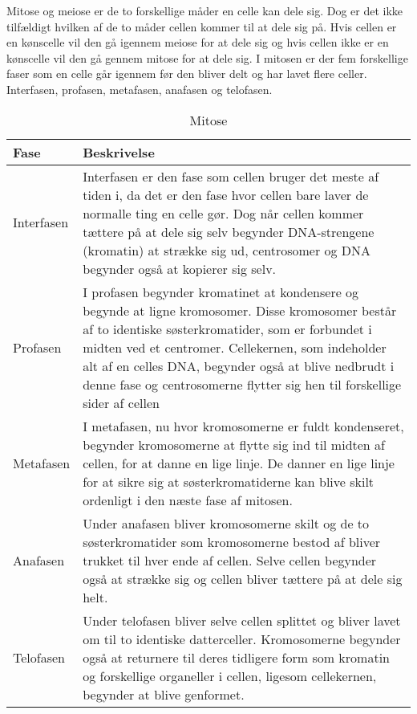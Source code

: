 Mitose og meiose er de to forskellige måder en celle kan dele sig. Dog er det ikke tilfældigt hvilken af de to måder cellen kommer til at dele sig på. Hvis cellen er en kønscelle vil den gå igennem meiose for at dele sig og hvis cellen ikke er en kønscelle vil den gå gennem mitose for at dele sig.
I mitosen er der fem forskellige faser som en celle går igennem før den bliver delt og har lavet flere celler. Interfasen, profasen, metafasen, anafasen og telofasen.
\begin{longtable}{ | m{2cm} | m{15cm}|}
    \caption{Mitose} \\
    \hline
    Fase & Beskrivelse \\ \hline
    Interfasen & Interfasen er den fase som cellen bruger det meste af tiden i, da det er den fase hvor cellen bare laver de normalle ting en celle gør. Dog når cellen kommer tættere på at dele sig selv begynder DNA-strengene (kromatin) at strække sig ud, centrosomer og DNA begynder også at kopierer sig selv. \\ \hline 

    Profasen & I profasen begynder kromatinet at kondensere og begynde at ligne kromosomer. Disse kromosomer består af to identiske søsterkromatider, som er forbundet i midten ved et centromer. Cellekernen, som indeholder alt af en celles DNA, begynder også at blive nedbrudt i denne fase og centrosomerne flytter sig hen til forskellige sider af cellen \\ \hline 

    Metafasen & I metafasen, nu hvor kromosomerne er fuldt kondenseret, begynder kromosomerne at flytte sig ind til midten af cellen, for at danne en lige linje. De danner en lige linje for at sikre sig at søsterkromatiderne kan blive skilt ordenligt i den næste fase af mitosen. \\ \hline 

    Anafasen &  Under anafasen bliver kromosomerne skilt og de to søsterkromatider som kromosomerne bestod af bliver trukket til hver ende af cellen. Selve cellen begynder også at strække sig og cellen bliver tættere på at dele sig helt. \\ \hline 

    Telofasen &  Under telofasen bliver selve cellen splittet og bliver lavet om til to identiske datterceller. Kromosomerne begynder også at returnere til deres tidligere form som kromatin og forskellige organeller i cellen, ligesom cellekernen, begynder at blive genformet. \\ \hline 
\end{longtable}

